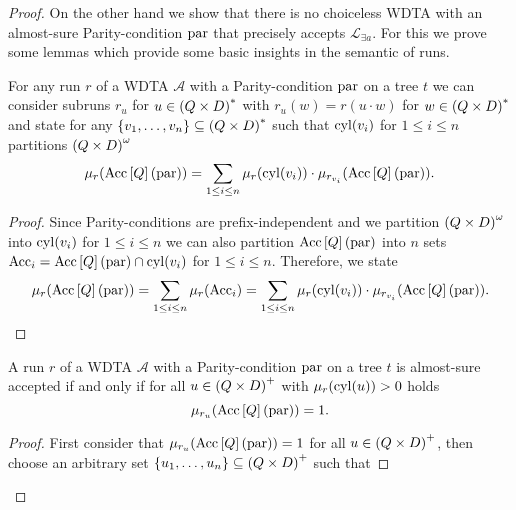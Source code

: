 \begin{proof}
  On the other hand we show that there is no choiceless \ac{WDTA} with an
  almost-sure Parity-condition $\operatorname{par}$ that precisely accepts 
  $\mathcal{L}_{\exists a}$. For this we prove some lemmas which provide some
  basic insights in the semantic of runs.
  \begin{lemma}
    For any run $r$ of a \ac{WDTA} $\mathcal{A}$ with a Parity-condition 
    $\operatorname{par}$ on a tree $t$ we can consider subruns $r_{u}$ for 
    $u\in\left(Q\times D\right)^{*}$ with $r_{u}(w) = r(u\cdot w)$ for 
    $w\in\left(Q\times D\right)^{*}$ and state for any 
    $\left\{v_{1},\dots, v_{n}\right\}\subseteq\left(Q\times D\right)^{*}$ such that
    $\operatorname{cyl}(v_{i})$ for $1\leq i\leq n$ partitions $\left(Q\times D\right)^{\omega}$
    \begin{equation*}
      \mu_{r}(\operatorname{Acc}\left[Q\right](\operatorname{par})) = \sum\limits_{1\leq i\leq n}
        \mu_{r}(\operatorname{cyl}(v_{i}))\cdot\mu_{r_{v_{i}}}(\operatorname{Acc}\left[Q\right](\operatorname{par})).
    \end{equation*}
    \label{lem:subrunsum}
  \end{lemma}
  \begin{proof}
    Since Parity-conditions are prefix-independent and we partition 
    $\left(Q\times D\right)^{\omega}$ into $\operatorname{cyl}(v_{i})$ for $1\leq i\leq n$ we can 
    also partition $\operatorname{Acc}\left[Q\right](\operatorname{par})$ into $n$ sets 
    $\operatorname{Acc}_{i} = \operatorname{Acc}\left[Q\right](\operatorname{par})\cap\operatorname{cyl}(v_{i})$ for $1\leq i\leq n$.
    Therefore, we state
    \begin{equation*}
      \mu_{r}(\operatorname{Acc}\left[Q\right](\operatorname{par})) = \sum\limits_{1\leq i\leq n}
        \mu_{r}(\operatorname{Acc}_{i}) = \sum\limits_{1\leq i\leq n}
        \mu_{r}(\operatorname{cyl}(v_{i}))\cdot\mu_{r_{v_{i}}}(\operatorname{Acc}\left[Q\right](\operatorname{par})).
    \end{equation*}
  \end{proof}
  \begin{lemma}
    A run $r$ of a \ac{WDTA} $\mathcal{A}$ with a Parity-condition $\operatorname{par}$ on 
    a tree $t$ is almost-sure accepted if and only if for all 
    $u\in\left(Q\times D\right)^{+}$ with $\mu_{r}(\operatorname{cyl}(u)) > 0$ holds
    \begin{equation*}
      \mu_{r_{u}}(\operatorname{Acc}\left[Q\right](\operatorname{par})) = 1.
    \end{equation*}
    \label{lem:subrun1}
  \end{lemma}
  \begin{proof}
    First consider that $\mu_{r_{u}}(\operatorname{Acc}\left[Q\right](\operatorname{par})) = 1$ for all
    $u\in\left(Q\times D\right)^{+}$, then choose an arbitrary set 
    $\left\{u_{1}, \dots, u_{n}\right\}\subseteq\left(Q\times D\right)^{+}$ such that

\end{proof}
\end{proof}
